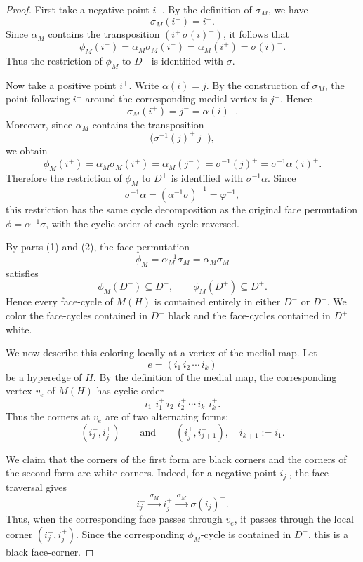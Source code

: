 \documentclass{article}
\begin{document}
\begin{proof}
First take a negative point \(i^-\). By the definition of \(\sigma_M\), we have
\[
    \sigma_M(i^-)=i^+.
\]
Since \(\alpha_M\) contains the transposition \((i^+\,\sigma(i)^-)\), it follows that
\[
    \phi_M(i^-)
    =\alpha_M\sigma_M(i^-)
    =\alpha_M(i^+)
    =\sigma(i)^-.
\]
Thus the restriction of \(\phi_M\) to \(D^-\) is identified with \(\sigma\).

Now take a positive point \(i^+\). Write \(\alpha(i)=j\). By the construction of
\(\sigma_M\), the point following \(i^+\) around the corresponding medial vertex is
\(j^-\). Hence
\[
    \sigma_M(i^+)=j^-=\alpha(i)^-.
\]
Moreover, since \(\alpha_M\) contains the transposition
\[
    \bigl(\sigma^{-1}(j)^+\,j^-\bigr),
\]
we obtain
\[
    \phi_M(i^+)
    =\alpha_M\sigma_M(i^+)
    =\alpha_M(j^-)
    =\sigma^{-1}(j)^+
    =\sigma^{-1}\alpha(i)^+.
\]
Therefore the restriction of \(\phi_M\) to \(D^+\) is identified with
\(\sigma^{-1}\alpha\). Since
\[
    \sigma^{-1}\alpha=(\alpha^{-1}\sigma)^{-1}=\varphi^{-1},
\]
this restriction has the same cycle decomposition as the original face permutation
\(\phi=\alpha^{-1}\sigma\), with the cyclic order of each cycle reversed.

By parts (1) and (2), the face permutation
\[
        \phi_M=\alpha_M^{-1}\sigma_M=\alpha_M\sigma_M
\]
satisfies
\[
        \phi_M(D^-)\subseteq D^-,
        \qquad
        \phi_M(D^+)\subseteq D^+ .
\]
Hence every face-cycle of \(M(H)\) is contained entirely in either
\(D^-\) or \(D^+\). We color the face-cycles contained in \(D^-\) black
and the face-cycles contained in \(D^+\) white.

We now describe this coloring locally at a vertex of the medial map. Let
\[
        e=(i_1\,i_2\,\cdots\,i_k)
\]
be a hyperedge of \(H\). By the definition of the medial map, the
corresponding vertex \(v_e\) of \(M(H)\) has cyclic order
\[
        i_1^-\, i_1^+\, i_2^-\, i_2^+\,\cdots\, i_k^-\, i_k^+ .
\]
Thus the corners at \(v_e\) are of two alternating forms:
\[
        (i_j^-,i_j^+)
        \qquad\text{and}\qquad
        (i_j^+,i_{j+1}^-),
        \quad i_{k+1}:=i_1 .
\]

We claim that the corners of the first form are black corners and the
corners of the second form are white corners. Indeed, for a negative
point \(i_j^-\), the face traversal gives
\[
        i_j^-
        \xrightarrow{\ \sigma_M\ }
        i_j^+
        \xrightarrow{\ \alpha_M\ }
        \sigma(i_j)^- .
\]
Thus, when the corresponding face passes through \(v_e\), it passes
through the local corner \((i_j^-,i_j^+)\). Since the corresponding
\(\phi_M\)-cycle is contained in \(D^-\), this is a black face-corner.


\end{proof}
\end{document}
